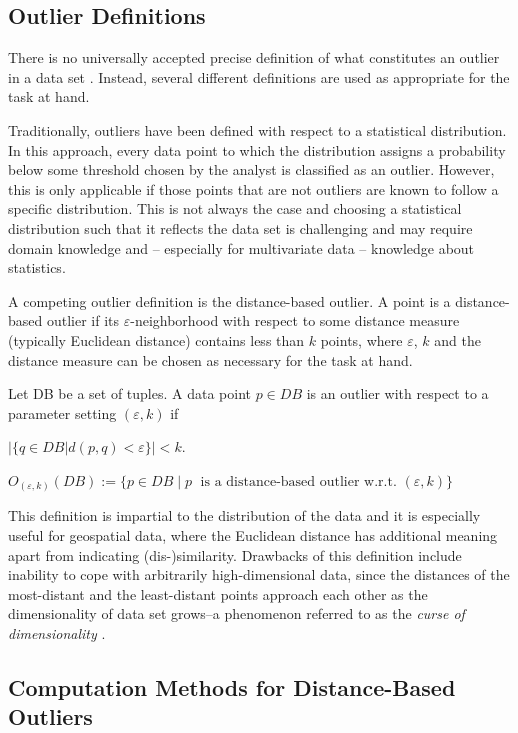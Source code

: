 \documentclass[runningheads]{llncs}
\begin{document}
\subsection{Outlier Definitions}

There is no universally accepted precise definition of what constitutes an outlier in a data set \cite{kriegeldefinitions,outlier_definitions}. Instead, several different definitions are used as appropriate for the task at hand.

Traditionally, outliers have been defined with respect to a statistical distribution. In this approach, every data point to which the distribution assigns a probability below some threshold chosen by the analyst is classified as an outlier. However, this is only applicable if those points that are not outliers are known to follow a specific distribution. This is not always the case and choosing a statistical distribution such that it reflects the data set is challenging and may require domain knowledge and -- especially for multivariate data -- knowledge about statistics.

A competing outlier definition is the distance-based outlier. A point is a distance-based outlier if its $\varepsilon$-neighborhood with respect to some distance measure (typically Euclidean distance) contains less than $k$ points, where $\varepsilon$, $k$ and the distance measure can be chosen as necessary for the task at hand.

\begin{definition}
    Let DB be a set of tuples. A data point $p\in DB$ is an outlier with respect to a parameter setting $(\varepsilon,k)$ if

    $|\{q \in DB | d(p,q) < \varepsilon\}| < k$.

    $O_{(\varepsilon,k)}(DB) := \{p\in DB \;| \;p\;\text{ is a distance-based outlier w.r.t. }(\varepsilon,k) \}$
\end{definition}

This definition is impartial to the distribution of the data and it is especially useful for geospatial data, where the Euclidean distance has additional meaning apart from indicating (dis-)similarity. Drawbacks of this definition include inability to cope with arbitrarily high-dimensional data, since the distances of the most-distant and the least-distant points approach each other as the dimensionality of data set grows--a phenomenon referred to as the \emph{curse of dimensionality} \cite{curse_of_dimensionality}.
\subsection{Computation Methods for Distance-Based Outliers}
\end{document}
